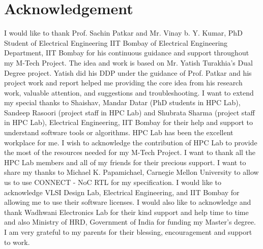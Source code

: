 \chapter*{Acknowledgement}
\hspace{5mm}I would like to thank Prof. Sachin Patkar and Mr. Vinay b. Y. Kumar, PhD Student of Electrical Engineering IIT Bombay of Electrical Engineering Department, IIT Bombay for his continuous guidance and support throughout my M-Tech Project. The idea and work is based on Mr. Yatish Turakhia's Dual Degree project. Yatish did his DDP under the guidance of Prof. Patkar and his project work and report helped me providing the core idea from his research work, valuable attention, and suggestions and troubleshooting. I want to extend my special thanks to Shaishav, Mandar Datar (PhD students in HPC Lab), Sandeep Rasoori (project staff in HPC Lab) and Shubrata Sharma (project staff in HPC Lab), Electrical Engineering, IIT Bombay for their help and support to understand software tools or algorithms. HPC Lab has been the excellent workplace for me. I wish to acknowledge the contribution of HPC Lab to provide the most of the resources needed for my M-Tech Project. I want to thank all the HPC Lab members and all of my friends for their precious support. I want to share my thanks to Michael K. Papamichael, Carnegie Mellon University to allow us to use CONNECT - NoC RTL for my specification. I would like to acknowledge VLSI Design Lab, Electrical Engineering, and IIT Bombay for allowing me to use their software licenses. I would also like to acknowledge and thank Wadhwani Electronics Lab for their kind support and help time to time and also Ministry of HRD, Government of India for funding my Master’s degree. I am very grateful to my parents for their blessing, encouragement and support to work.
